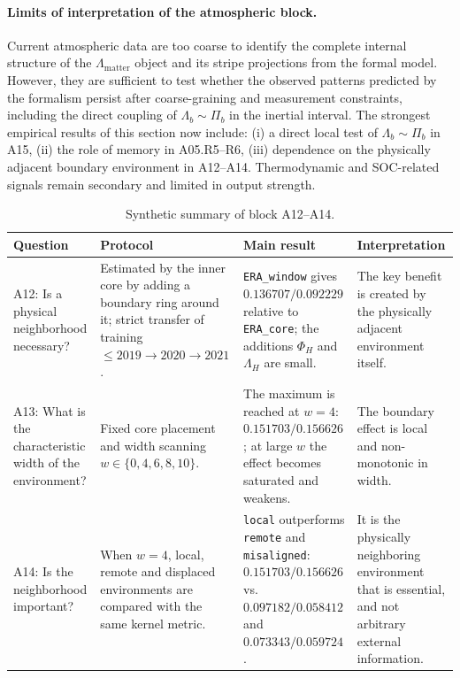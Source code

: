 \documentclass[11pt,a4paper]{article}
\theoremstyle{definition}
\theoremstyle{plain}
\theoremstyle{remark}
\begin{document}
\paragraph{Limits of interpretation of the atmospheric block.}
Current atmospheric data are too coarse to identify the complete internal structure of the $\Lambda_{\mathrm{matter}}$ object and its stripe projections from the formal model.
However, they are sufficient to test whether the observed patterns predicted by the formalism persist after coarse-graining and measurement constraints, including the direct coupling of $\Lambda_b\sim\Pi_b$ in the inertial interval.
The strongest empirical results of this section now include: (i) a direct local test of \(\Lambda_b\sim\Pi_b\) in A15, (ii) the role of memory in A05.R5--R6, (iii) dependence on the physically adjacent boundary environment in A12--A14. Thermodynamic and SOC-related signals remain secondary and limited in output strength.

\begin{table}[H]
\centering
\caption{Synthetic summary of block A12--A14.}
\label{tab:A12_A14_summary}
\small
\begin{tabular}{@{}p{2.8cm}p{3.9cm}p{4.0cm}p{4.0cm}@{}}
\toprule
Question & Protocol & Main result & Interpretation \\
\midrule
A12: Is a physical neighborhood necessary? & Estimated by the inner core by adding a boundary ring around it; strict transfer of training$\le 2019 \rightarrow 2020 \rightarrow 2021$. & \texttt{ERA\_window} gives $0.136707/0.092229$ relative to \texttt{ERA\_core}; the additions $\Phi_H$ and $\Lambda_H$ are small. & The key benefit is created by the physically adjacent environment itself. \\
A13: What is the characteristic width of the environment? & Fixed core placement and width scanning $w\in\{0,4,6,8,10\}$. & The maximum is reached at $w=4$: $0.151703/0.156626$; at large $w$ the effect becomes saturated and weakens. & The boundary effect is local and non-monotonic in width. \\
A14: Is the neighborhood important? & When $w=4$, local, remote and displaced environments are compared with the same kernel metric. & \texttt{local} outperforms \texttt{remote} and \texttt{misaligned}: $0.151703/0.156626$ vs. $0.097182/0.058412$ and $0.073343/0.059724$. & It is the physically neighboring environment that is essential, and not arbitrary external information. \\
\bottomrule
\end{tabular}
\end{table}
\end{document}
